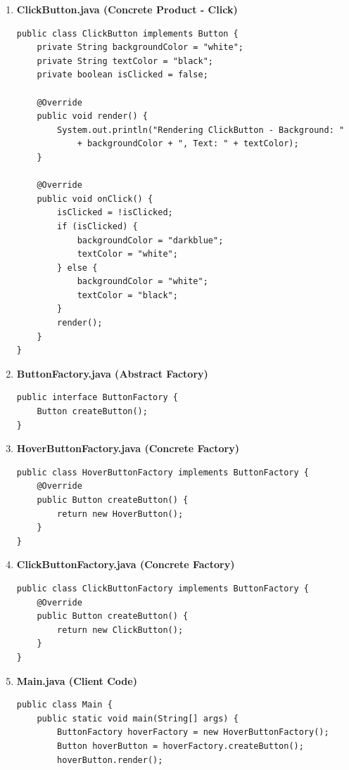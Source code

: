 \documentclass[a4paper]{article}
\begin{document}
\begin{enumerate}[itemsep=1em]
\begin{enumerate}[itemsep=1em]
\begin{verbatim}
    @Override
    public void render() {
        System.out.println("Rendering HoverButton with background: " 
            + backgroundColor);
    }

    @Override
    public void onClick() {
        System.out.println("HoverButton clicked!");
    }

    public void onMouseEnter() {
        isHovered = true;
        backgroundColor = "lightblue";
        render();
    }

    public void onMouseLeave() {
        isHovered = false;
        backgroundColor = "white";
        render();
    }
}
    \end{verbatim}
    \item \textbf{ClickButton.java (Concrete Product - Click)}
    \begin{verbatim}
public class ClickButton implements Button {
    private String backgroundColor = "white";
    private String textColor = "black";
    private boolean isClicked = false;

    @Override
    public void render() {
        System.out.println("Rendering ClickButton - Background: " 
            + backgroundColor + ", Text: " + textColor);
    }

    @Override
    public void onClick() {
        isClicked = !isClicked;
        if (isClicked) {
            backgroundColor = "darkblue";
            textColor = "white";
        } else {
            backgroundColor = "white";
            textColor = "black";
        }
        render();
    }
}
    \end{verbatim}
    \item \textbf{ButtonFactory.java (Abstract Factory)}
    \begin{verbatim}
public interface ButtonFactory {
    Button createButton();
}
    \end{verbatim}
    \item \textbf{HoverButtonFactory.java (Concrete Factory)}
    \begin{verbatim}
public class HoverButtonFactory implements ButtonFactory {
    @Override
    public Button createButton() {
        return new HoverButton();
    }
}
    \end{verbatim}
    \item \textbf{ClickButtonFactory.java (Concrete Factory)}
    \begin{verbatim}
public class ClickButtonFactory implements ButtonFactory {
    @Override
    public Button createButton() {
        return new ClickButton();
    }
}
      \end{verbatim}
    \item \textbf{Main.java (Client Code)}
    \begin{verbatim}
public class Main {
    public static void main(String[] args) {
        ButtonFactory hoverFactory = new HoverButtonFactory();
        Button hoverButton = hoverFactory.createButton();
        hoverButton.render();
        

\end{verbatim}
\end{enumerate}
\end{enumerate}
\end{document}
